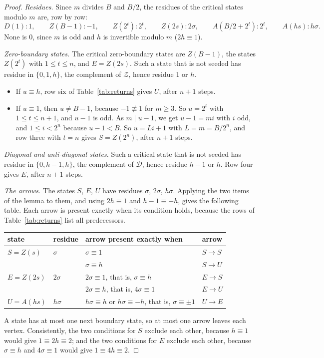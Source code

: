 \documentclass[11pt]{amsart}
\theoremstyle{definition}
\theoremstyle{remark}
\newcommand{\Zs}{\mathcal{Z}}
\newcommand{\Ds}{\mathcal{D}}
\begin{document}
\begin{proof}
\emph{Residues.} Since $m$ divides $B$ and $B/2$, the residues of the critical states modulo $m$ are, row by row:
\[
D(1)\colon 1,\qquad Z(B-1)\colon -1,\qquad Z(2^t)\colon 2^t,\qquad Z(2s)\colon 2\sigma,\qquad A(B/2+2^t)\colon 2^t,\qquad A(hs)\colon h\sigma.
\]
None is $0$, since $m$ is odd and $h$ is invertible modulo $m$ ($2h\equiv1$).

\emph{Zero-boundary states.} The critical zero-boundary states are $Z(B-1)$, the states $Z(2^t)$ with $1\le t\le n$, and $E=Z(2s)$. Such a state that is not seeded has residue in $\{0,1,h\}$, the complement of $\Zs$, hence residue $1$ or $h$.
\begin{itemize}
\item If $u\equiv h$, row six of Table~\ref{tab:returns} gives $U$, after $n+1$ steps.
\item If $u\equiv1$, then $u\ne B-1$, because $-1\not\equiv1$ for $m\ge3$. So $u=2^t$ with $1\le t\le n+1$, and $u-1$ is odd. As $m\mid u-1$, we get $u-1=mi$ with $i$ odd, and $1\le i<2^n$ because $u-1<B$. So $u=Li+1$ with $L=m=B/2^n$, and row three with $t=n$ gives $S=Z(2^n)$, after $n+1$ steps.
\end{itemize}

\emph{Diagonal and anti-diagonal states.} Such a critical state that is not seeded has residue in $\{0,h-1,h\}$, the complement of $\Ds$, hence residue $h-1$ or $h$. Row four gives $E$, after $n+1$ steps.

\emph{The arrows.} The states $S$, $E$, $U$ have residues $\sigma$, $2\sigma$, $h\sigma$. Applying the two items of the lemma to them, and using $2h\equiv1$ and $h-1\equiv-h$, gives the following table. Each arrow is present exactly when its condition holds, because the rows of Table~\ref{tab:returns} list all predecessors.
\begin{center}
\renewcommand{\arraystretch}{1.15}
\begin{tabular}{@{}llll@{}}
\toprule
state & residue & arrow present exactly when & arrow\\
\midrule
$S=Z(s)$ & $\sigma$ & $\sigma\equiv1$ & $S\to S$\\
 & & $\sigma\equiv h$ & $S\to U$\\
$E=Z(2s)$ & $2\sigma$ & $2\sigma\equiv1$, that is, $\sigma\equiv h$ & $E\to S$\\
 & & $2\sigma\equiv h$, that is, $4\sigma\equiv1$ & $E\to U$\\
$U=A(hs)$ & $h\sigma$ & $h\sigma\equiv h$ or $h\sigma\equiv-h$, that is, $\sigma\equiv\pm1$ & $U\to E$\\
\bottomrule
\end{tabular}
\end{center}
A state has at most one next boundary state, so at most one arrow leaves each vertex. Consistently, the two conditions for $S$ exclude each other, because $h\equiv1$ would give $1\equiv2h\equiv2$; and the two conditions for $E$ exclude each other, because $\sigma\equiv h$ and $4\sigma\equiv1$ would give $1\equiv4h\equiv2$.
\end{proof}
\end{document}

